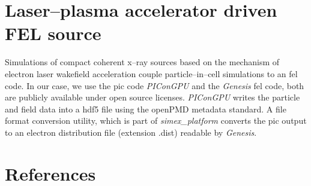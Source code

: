 \documentclass[12pt]{scrartcl}
\begin{document}
%
\section{Laser--plasma accelerator driven FEL source}\label{sec:lwfa_source}
%
Simulations of compact coherent x--ray sources based on the mechanism of
electron laser wakefield acceleration  couple particle--in--cell
simulations to an \gls{fel} code. In our case, we use the \gls{pic} code \textit{PIConGPU}
and the \textit{Genesis} \gls{fel} code, both are publicly available under open source licenses.
\textit{PIConGPU} writes the particle and field data
into a hdf5 file using the openPMD \cite{Huebl2017} metadata standard. A file format conversion utility, which is part of
\textit{simex\_platform} converts the \gls{pic} output to an electron distribution
file (extension .dist) readable by \textit{Genesis}.




\FloatBarrier

\section{References}
%
\printbibliography[notkeyword=submitted, notkeyword=inpreparation, notkeyword=report, notkeyword=zenodo, title={Journal articles}]
%
\printbibliography[keyword=submitted, title={Submitted articles}]
%
\printbibliography[keyword=inpreparation, title={Articles in preparation}]
%
\printbibliography[keyword=eucall, keyword=report, title={EUCALL reports}]
%
\printbibliography[keyword=zenodo, title={Zenodo depositions}]
\end{document}
